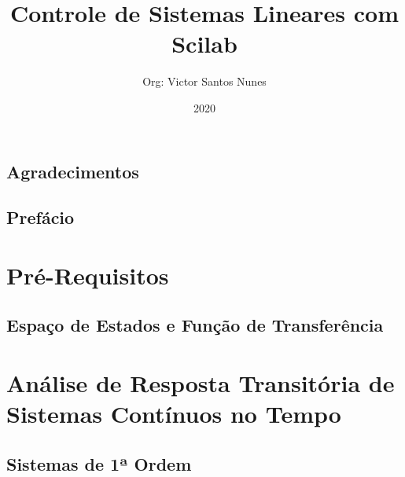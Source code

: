 \documentclass[a4paper, 12pt, openany]{book}
\title{\Huge Controle de Sistemas Lineares com Scilab}
\author{Org: Victor Santos Nunes}
\date{2020}
\begin{document}
    \frontmatter
    
    \maketitle
    
    \tableofcontents
    
    \chapter{Agradecimentos}
    
    
    \chapter{Prefácio}
    
    
    \mainmatter
    
    \part{Pré-Requisitos}
    
    \chapter{Espaço de Estados e Função de Transferência}
    
    \newpage
    
    \newpage
    
    
    \part{Análise de Resposta Transitória de Sistemas Contínuos no Tempo}
    \chapter{Sistemas de 1ª Ordem}
    
    
\end{document}
